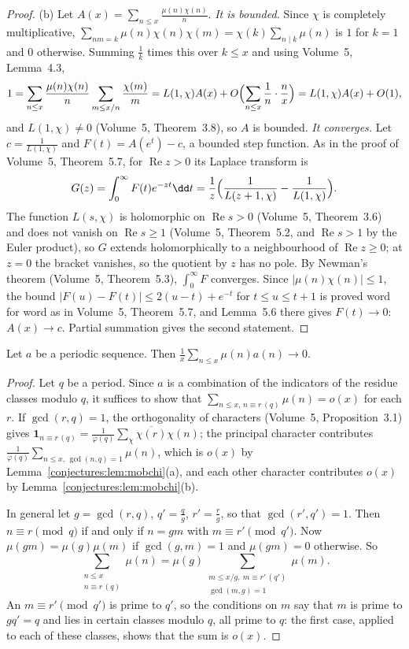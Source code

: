 \begin{proof}
(b) Let $A(x)=\sum_{n\le x}\frac{\mu(n)\chi(n)}n$. \emph{It is bounded.} Since $\chi$ is completely multiplicative, $\sum_{nm=k}\mu(n)\chi(n)\chi(m)=\chi(k)\sum_{n\mid k}\mu(n)$
is $1$ for $k=1$ and $0$ otherwise. Summing $\frac1k$ times this over $k\le x$ and using Volume~5, Lemma~4.3,
\[
1=\sum_{n\le x}\frac{\mu(n)\chi(n)}n\sum_{m\le x/n}\frac{\chi(m)}m=L(1,\chi)A(x)+O\Bigl(\sum_{n\le x}\frac1n\cdot\frac nx\Bigr)=L(1,\chi)A(x)+O(1),
\]
and $L(1,\chi)\ne0$ (Volume~5, Theorem~3.8), so $A$ is bounded. \emph{It converges.} Let $c=\frac1{L(1,\chi)}$ and $F(t)=A(e^t)-c$, a bounded step function. As in the proof
of Volume~5, Theorem~5.7, for $\operatorname{Re}z>0$ its Laplace transform is
\[
G(z)=\int_0^\infty F(t)e^{-zt}\dd t=\frac1z\Bigl(\frac1{L(z+1,\chi)}-\frac1{L(1,\chi)}\Bigr).
\]
The function $L(s,\chi)$ is holomorphic on $\operatorname{Re}s>0$ (Volume~5, Theorem~3.6) and does not vanish on $\operatorname{Re}s\ge1$ (Volume~5, Theorem~5.2, and
$\operatorname{Re}s>1$ by the Euler product), so $G$ extends holomorphically to a neighbourhood of $\operatorname{Re}z\ge0$; at $z=0$ the bracket vanishes, so the
quotient by $z$ has no pole. By Newman's theorem (Volume~5, Theorem~5.3), $\int_0^\infty F$ converges. Since $|\mu(n)\chi(n)|\le1$, the bound
$|F(u)-F(t)|\le2(u-t)+e^{-t}$ for $t\le u\le t+1$ is proved word for word as in Volume~5, Theorem~5.7, and Lemma~5.6 there gives $F(t)\to0$: $A(x)\to c$. Partial
summation gives the second statement.
\end{proof}

\begin{proposition}\label{conjectures:prop:mobperiodic}
Let $a$ be a periodic sequence. Then $\frac1x\sum_{n\le x}\mu(n)a(n)\to0$.
\end{proposition}
\begin{proof}
Let $q$ be a period. Since $a$ is a combination of the indicators of the residue classes modulo $q$, it suffices to show that
$\sum_{n\le x,\,n\equiv r\,(q)}\mu(n)=o(x)$ for each $r$. If $\gcd(r,q)=1$, the orthogonality of characters (Volume~5, Proposition~3.1) gives
$\mathbf1_{n\equiv r\,(q)}=\frac1{\varphi(q)}\sum_\chi\overline{\chi(r)}\chi(n)$; the principal character contributes $\frac1{\varphi(q)}\sum_{n\le x,\,\gcd(n,q)=1}\mu(n)$,
which is $o(x)$ by Lemma~\ref{conjectures:lem:mobchi}(a), and each other character contributes $o(x)$ by Lemma~\ref{conjectures:lem:mobchi}(b).

In general let $g=\gcd(r,q)$, $q'=\frac qg$, $r'=\frac rg$, so that $\gcd(r',q')=1$. Then $n\equiv r\pmod q$ if and only if $n=gm$ with $m\equiv r'\pmod{q'}$.
Now $\mu(gm)=\mu(g)\mu(m)$ if $\gcd(g,m)=1$ and $\mu(gm)=0$ otherwise. So
\[
\sum_{\substack{n\le x\\n\equiv r\,(q)}}\mu(n)=\mu(g)\sum_{\substack{m\le x/g,\ m\equiv r'\,(q')\\\gcd(m,g)=1}}\mu(m).
\]
An $m\equiv r'\pmod{q'}$ is prime to $q'$, so the conditions on $m$ say that $m$ is prime to $gq'=q$ and lies in certain classes modulo $q$, all prime to $q$:
the first case, applied to each of these classes, shows that the sum is $o(x)$.
\end{proof}

